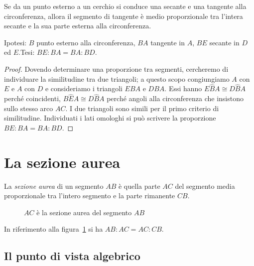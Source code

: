 \begin{teorema}
Se da un punto esterno a un cerchio si conduce una secante e una tangente alla circonferenza, allora il segmento di tangente è medio proporzionale tra l'intera secante e la sua parte esterna alla circonferenza.
\end{teorema}

\noindent Ipotesi: $B$ punto esterno alla circonferenza, $BA$ tangente in $A$, $BE$ secante in $D$ ed $E$.\tab Tesi: $BE:BA=BA:BD$.

\noindent\begin{minipage}{0.65\textwidth}\parindent15pt
\begin{proof}
Dovendo determinare una proporzione tra segmenti, cercheremo di individuare la similitudine tra due triangoli; a questo scopo congiungiamo $A$ con $E$ e $A$ con $D$ e consideriamo i triangoli $EBA$ e $DBA$. Essi hanno $E\widehat{B}A\cong D\widehat{B}A$ perché coincidenti, $B\widehat{E}A\cong D\widehat{B}A$ perché angoli alla circonferenza che insistono sullo stesso arco $AC$. I due triangoli sono simili per il primo criterio di similitudine. Individuati i lati omologhi si può scrivere la proporzione $BE:BA=BA:BD$.
\end{proof}
\end{minipage}\hfil
\begin{minipage}{0.35\textwidth}
	\centering
\end{minipage}\vspace{5pt}

\section{La sezione aurea}

\begin{definizione}
La \emph{sezione aurea} di un segmento $AB$ è quella parte $AC$ del segmento media proporzionale tra l'intero segmento e la parte rimanente $CB$.
\end{definizione}

\begin{figure}[!htb]
	\centering
	\caption{$AC$ è la sezione aurea del segmento $AB$}\label{fig:sez_aurea}
\end{figure}

In riferimento alla figura~\ref{fig:sez_aurea} si ha $AB : AC = AC : CB$.

\subsection{Il punto di vista algebrico}

